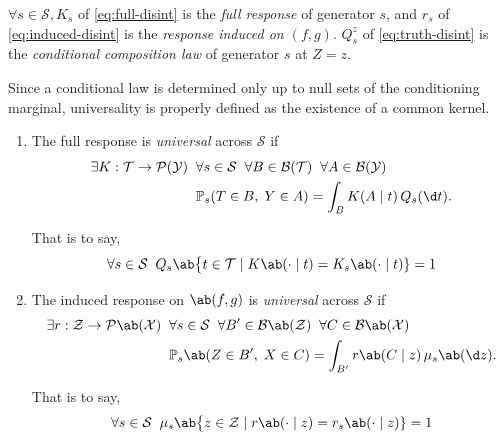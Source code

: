 \documentclass[12pt]{article}
\newcommand{\Prb}{\mathbb{P}}
\newcommand{\Gens}{\mathcal{S}}
\newcommand{\Meas}{\mathcal{P}}
\newcommand{\Borel}{\mathcal{B}}
\newcommand{\1}{\mathbbm{1}}
\renewcommand{\[}{\begin{equation}}
\renewcommand{\]}{\end{equation}}
\begin{document}
    \begin{definition}
    \label{def:responses}
        \(\forall s\in\Gens, K_s\) of \cref{eq:full-disint} is the \emph{full response} of generator \(s\), and \(r_s\) of \cref{eq:induced-disint} is the \emph{response induced on \((f,g)\)}.
        \(Q_s^{z}\) of \cref{eq:truth-disint} is the \emph{conditional composition law} of generator \(s\) at \(Z=z\).
    \end{definition}

    Since a conditional law is determined only up to null sets of the conditioning marginal, universality is properly defined as the existence of a common kernel.

\begin{definition}[Universality]
    \label{def:universal-response}
        \leavevmode
        \begin{enumerate}
            \item The full response is \emph{universal} across \(\Gens\) if 
            \[
                \begin{split}
                  \exists K : \mathcal{T} \to \Meas(\mathcal{Y}) \;\;
                  &\forall s \in \Gens \;\; \forall B \in \Borel(\mathcal{T}) \;\; \forall A \in \Borel(\mathcal{Y}) \\
                  &\Prb_s(T \in B,\; Y \in A) = \int_B K(A \mid t)\,Q_s(\d t).
                \end{split}
            \]
            
            That is to say,
            \[
                \forall s \in \Gens \;\; Q_s\ab\big\{t \in \mathcal T \mid K \ab( \cdot \mid t) = K_s \ab( \cdot \mid t)\} = 1
            \]

            \item The induced response on \(\ab(f, g)\) is \emph{universal} across \(\Gens\) if
            \[
                \begin{split}
                    \exists r : \mathcal Z \to \Meas \ab( \mathcal X) \;\; &\forall s \in \Gens \;\; \forall B' \in \Borel \ab(\mathcal Z) \;\; \forall C \in \Borel \ab(\mathcal X) \\
                    &\Prb_s \ab(Z \in B',\; X \in C) = \int_{B'} r \ab(C \mid z)\,\mu_s \ab(\d z).
                \end{split}
            \]
            
            That is to say,
            \[
                \forall s \in \Gens \;\; \mu_s\ab\big\{z \in \mathcal Z \mid r \ab( \cdot \mid z) = r_s \ab( \cdot \mid z)\} = 1
            \]


\end{enumerate}
\end{definition}
\end{document}
